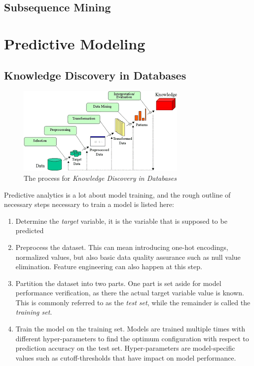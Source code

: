 \subsection{Subsequence Mining}

\section{Predictive Modeling}
\subsection{Knowledge Discovery in Databases}
\begin{figure}
	\centering
	\includegraphics[width=\textwidth]{gfx/kdd_process}
	\caption{The process for \textit{Knowledge Discovery in Databases}}
	\label{fig:kdd_process}
\end{figure}
Predictive analytics is a lot about model training, and the rough outline of necessary steps necessary to train a model is listed here:
\begin{enumerate}
	\item Determine the \textit{target} variable, it is the variable that is supposed to be predicted
	\item Preprocess the dataset. This can mean introducing one-hot encodings, normalized values, but also basic data quality assurance such as null value elimination. Feature engineering can also happen at this step.
	\item Partition the dataset into two parts. One part is set aside for model performance verification, as there the actual target variable value is known. This is commonly referred to as the \textit{test set}, while the remainder is called the \textit{training set}.
	\item Train the model on the training set. Models are trained multiple times with different hyper-parameters to find the optimum configuration with respect to prediction accuracy on the test set. Hyper-parameters are model-specific values such as cutoff-thresholds that have impact on model performance.
\end{enumerate}

